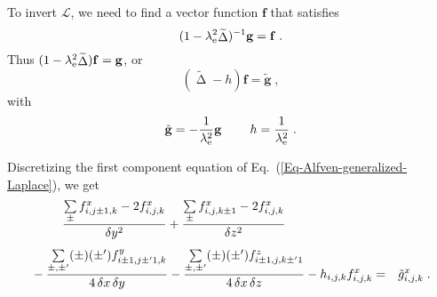 \documentclass[\mydriver,12pt,twoside,notitlepage,letterpaper]{article}
\newcommand{\fv}      {\mathbf{f}}
\newcommand{\gv}      {\mathbf{g}}
\newcommand{\Laplace} { \mathop{\Delta}\nolimits}
\begin{document}
To invert $\mathcal{L}$, we need to find a vector function $\fv$ that
satisfies
\begin{equation}
  (1 - \lambda_{\rm e}^2 \widetilde{\Laplace})^{-1} \gv = \fv \; .
\end{equation}
Thus $(1- \lambda_{\rm e}^2 \widetilde{\Laplace}) \fv = \gv$, or
\begin{equation}
  \label{Eq-Alfven-generalized-Laplace}
  (\widetilde{\Laplace} - h) \fv = \tilde{\gv} \; ,
\end{equation}
with
\begin{equation}
  \tilde{\gv} = -\dfrac{1}{\lambda_{\rm e}^2} \gv \; \qquad
  h = \dfrac{1}{\lambda_{\rm e}^2} \; .
\end{equation}

Discretizing the first component equation of
Eq.~(\ref{Eq-Alfven-generalized-Laplace}), we get
\begin{eqnarray}
  \dfrac{\sum\limits_{\pm}
           f^{x}_{i,j\pm1,k} - 2 f^{x}_{i,j,k}}
        {\delta y^2}
  +
  \dfrac{\sum\limits_{\pm}
           f^{x}_{i,j,k\pm1} - 2 f^{x}_{i,j,k}}
        {\delta z^2}
  \hspace*{7em}
  \nonumber \\[1ex]
  {}
  -
  \dfrac{\sum\limits_{\pm,\pm'}
           (\pm) (\pm') f^{y}_{i\pm1,j\pm'1,k}}
        {4\,\delta x\,\delta y}
  -
  \dfrac{\sum\limits_{\pm,\pm'}
           (\pm) (\pm') f^{z}_{i\pm1,j,k\pm'1}}
        {4\,\delta x\,\delta z}
  - h_{i,j,k} f^{x}_{i,j,k}
  &=& \tilde{g}^{x}_{i,j,k} \; . 
\end{eqnarray}
\end{document}
